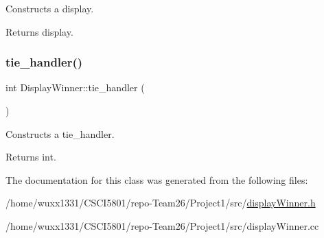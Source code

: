 Constructs a display. 

\begin{DoxyReturn}{Returns}
display. 
\end{DoxyReturn}
\mbox{\label{classDisplayWinner_a59d69fff466af18ed00e925c22cbd616}} 
\subsubsection{\texorpdfstring{tie\+\_\+handler()}{tie\_handler()}}
{\footnotesize\ttfamily int Display\+Winner\+::tie\+\_\+handler (\begin{DoxyParamCaption}{ }\end{DoxyParamCaption})}



Constructs a tie\+\_\+handler. 

\begin{DoxyReturn}{Returns}
int. 
\end{DoxyReturn}


The documentation for this class was generated from the following files\+:\begin{DoxyCompactItemize}
\item 
/home/wuxx1331/\+C\+S\+C\+I5801/repo-\/\+Team26/\+Project1/src/\hyperlink{displayWinner_8h}{display\+Winner.\+h}\item 
/home/wuxx1331/\+C\+S\+C\+I5801/repo-\/\+Team26/\+Project1/src/display\+Winner.\+cc\end{DoxyCompactItemize}
